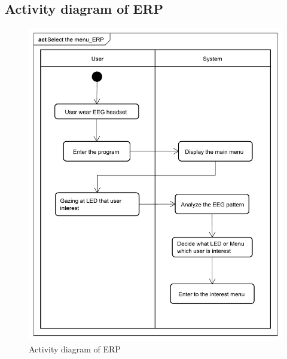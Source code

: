 \subsection{Activity diagram of ERP}
\begin{figure}[ht]
	\centering
	\includegraphics[scale = 0.30]{chapter4/av_ERP.pdf}
	\caption{Activity diagram of ERP}
\end{figure}

\newpage
